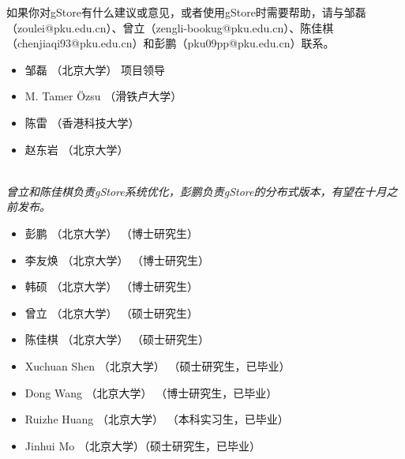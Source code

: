 \documentclass[titlepage, a4paper, 12pt]{article}
\begin{document}
如果你对gStore有什么建议或意见，或者使用gStore时需要帮助，请与邹磊（zoulei@pku.edu.cn）、曾立（zengli-bookug@pku.edu.cn）、陈佳棋（chenjiaqi93@pku.edu.cn）和彭鹏（pku09pp@pku.edu.cn）联系。


\begin{itemize}
	\item
	邹磊 （北京大学） 项目领导
	\item
	M. Tamer {\"O}zsu （滑铁卢大学）
	\item
	陈雷 （香港科技大学）
	\item
	赵东岩 （北京大学）
\end{itemize}


\quad \\

\textit{曾立和陈佳棋负责gStore系统优化，彭鹏负责gStore的分布式版本，有望在十月之前发布。}

\begin{itemize}
	\item
	彭鹏 （北京大学） （博士研究生）
	\item
	李友焕 （北京大学） （博士研究生）
	\item
	韩硕 （北京大学） （博士研究生）
	\item
	曾立 （北京大学） （硕士研究生）
	\item
	陈佳棋 （北京大学） （硕士研究生）
\end{itemize}


\begin{itemize}
	\item
	Xuchuan Shen （北京大学） （硕士研究生，已毕业）
	\item
	Dong Wang （北京大学） （博士研究生，已毕业）
	\item
	Ruizhe Huang （北京大学） （本科实习生，已毕业）
	\item
	Jinhui Mo （北京大学）（硕士研究生，已毕业）
\end{itemize}
\end{document}
